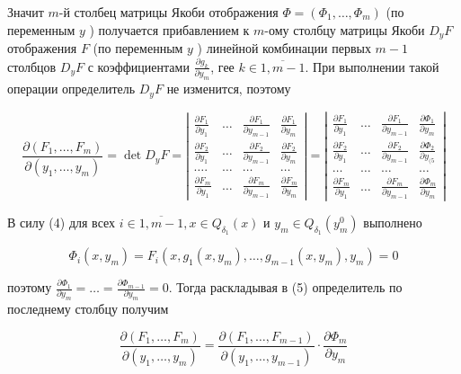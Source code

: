 \documentclass[a4paper,12pt]{article} %
\begin{document}
Значит $m$-й столбец матрицы Якоби отображения $\Phi=\left(\Phi_{1}, \ldots, \Phi_{m}\right)$ (по переменным $y$ ) получается прибавлением к $m$-ому столбцу матрицы Якоби $D_{y} F$ отображения $F$ (по переменным $y$ ) линейной комбинации первых $m-1$ столбцов $D_{y} F$ с коэффициентами $\frac{\partial g_{k}}{\partial y_{m}}$, гее $k \in \overline{1, m-1}$. При выполнении такой операции определитель $D_{y} F$ не изменится, поэтому

$$
\frac{\partial\left(F_{1}, \ldots, F_{m}\right)}{\partial\left(y_{1}, \ldots, y_{m}\right)}=\operatorname{det} D_{y} F=\left|\begin{array}{llll}
\frac{\partial F_{1}}{\partial y_{1}} & \ldots & \frac{\partial F_{1}}{\partial y_{m-1}} & \frac{\partial F_{1}}{\partial y_{m}} \\
\frac{\partial F_{2}}{\partial y_{1}} & \ldots & \frac{\partial F_{2}}{\partial y_{m-1}} & \frac{\partial F_{2}}{\partial y_{m}} \\
\ldots . & \ldots & \ldots & \ldots \\
\frac{\partial F_{m}}{\partial y_{1}} & \ldots & \frac{\partial F_{m}}{\partial y_{m-1}} & \frac{\partial F_{m}}{\partial y_{m}}
\end{array}\right|=\left|\begin{array}{llll}
\frac{\partial F_{1}}{\partial y_{1}} & \ldots & \frac{\partial F_{1}}{\partial y_{m-1}} & \frac{\partial \Phi_{1}}{\partial y_{m}} \\
\frac{\partial F_{2}}{\partial y_{1}} & \ldots & \frac{\partial F_{2}}{\partial y_{m-1}} & \frac{\partial \Phi_{2}}{\partial y_{(5}} \\
\ldots & \ldots & \ldots & \ldots \\
\frac{\partial F_{m}}{\partial y_{1}} & \ldots & \frac{\partial F_{m}}{\partial y_{m-1}} & \frac{\partial \Phi_{m}}{\partial y_{m}}
\end{array}\right|
$$

В силу (4) для всех $i \in \overline{1, m-1}, x \in Q_{\delta_{1}}(x)$ и $y_{m} \in Q_{\delta_{1}}\left(y_{m}^{0}\right)$ выполнено

$$
\Phi_{i}\left(x, y_{m}\right)=F_{i}\left(x, g_{1}\left(x, y_{m}\right), \ldots, g_{m-1}\left(x, y_{m}\right), y_{m}\right)=0
$$

поэтому $\frac{\partial \Phi_{1}}{\partial y_{m}}=\ldots=\frac{\partial \Phi_{m-1}}{\partial y_{m}}=0$. Тогда раскладывая в (5) определитель по последнему столбцу получим

$$
\frac{\partial\left(F_{1}, \ldots, F_{m}\right)}{\partial\left(y_{1}, \ldots, y_{m}\right)}=\frac{\partial\left(F_{1}, \ldots, F_{m-1}\right)}{\partial\left(y_{1}, \ldots, y_{m-1}\right)} \cdot \frac{\partial \Phi_{m}}{\partial y_{m}}
$$
\end{document}
